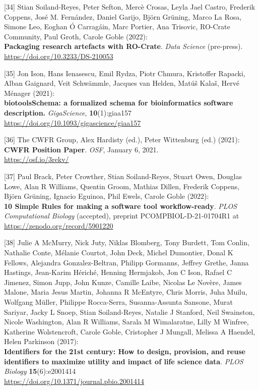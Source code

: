 {[}34{]} Stian Soiland-Reyes, Peter Sefton, Mercè Crosas, Leyla Jael
Castro, Frederik Coppens, José M. Fernández, Daniel Garijo, Björn
Grüning, Marco La Rosa, Simone Leo, Eoghan Ó Carragáin, Marc Portier,
Ana Trisovic, RO-Crate Community, Paul Groth, Carole Goble (2022):\\
\textbf{Packaging research artefacts with RO-Crate}. \emph{Data Science}
(pre-press).\\
\url{https://doi.org/10.3233/DS-210053}

{[}35{]} Jon Ison, Hans Ienasescu, Emil Rydza, Piotr Chmura, Kristoffer
Rapacki, Alban Gaignard, Veit Schwämmle, Jacques van Helden, Matúš
Kalaš, Hervé Ménager (2021):\\
\textbf{biotoolsSchema: a formalized schema for bioinformatics software
description.} \emph{GigaScience}, \textbf{10}(1):giaa157\\
\url{https://doi.org/10.1093/gigascience/giaa157}

{[}36{]} The CWFR Group, Alex Hardisty (ed.), Peter Wittenburg (ed.)
(2021):\\
\textbf{CWFR Position Paper}. \emph{OSF}, January 6, 2021.\\
\url{https://osf.io/3rekv/}

{[}37{]} Paul Brack, Peter Crowther, Stian Soiland-Reyes, Stuart Owen,
Douglas Lowe, Alan R Williams, Quentin Groom, Mathias Dillen, Frederik
Coppens, Björn Grüning, Ignacio Eguinoa, Phil Ewels, Carole Goble
(2022):\\
\textbf{10 Simple Rules for making a software tool workflow-ready}.
\emph{PLOS Computational Biology} (accepted), preprint
PCOMPBIOL-D-21-01704R1 at \url{https://zenodo.org/record/5901220}

{[}38{]} Julie A McMurry, Nick Juty, Niklas Blomberg, Tony Burdett, Tom
Conlin, Nathalie Conte, Mélanie Courtot, John Deck, Michel Dumontier,
Donal K Fellows, Alejandra Gonzalez-Beltran, Philipp Gormanns, Jeffrey
Grethe, Janna Hastings, Jean-Karim Hériché, Henning Hermjakob, Jon C
Ison, Rafael C Jimenez, Simon Jupp, John Kunze, Camille Laibe, Nicolas
Le Novère, James Malone, Maria Jesus Martin, Johanna R McEntyre, Chris
Morris, Juha Muilu, Wolfgang Müller, Philippe Rocca-Serra,
Susanna-Assunta Sansone, Murat Sariyar, Jacky L Snoep, Stian
Soiland-Reyes, Natalie J Stanford, Neil Swainston, Nicole Washington,
Alan R Williams, Sarala M Wimalaratne, Lilly M Winfree, Katherine
Wolstencroft, Carole Goble, Cristopher J Mungall, Melissa A Haendel,
Helen Parkinson (2017):\\
\textbf{Identifiers for the 21st century: How to design, provision, and
reuse identifiers to maximize utility and impact of life science data}.
\emph{PLOS Biology} \textbf{15}(6):e2001414\\
\url{https://doi.org/10.1371/journal.pbio.2001414}

